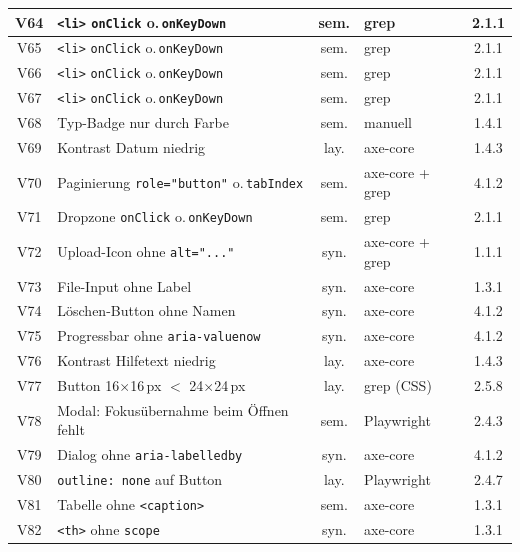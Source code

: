 \begin{longtable}{|c|p{5.8cm}|c|p{3.6cm}|c|}
V64  & \texttt{<li>} \texttt{onClick} o.\,\texttt{onKeyDown} & sem. & grep    & 2.1.1 \\ \hline
V65  & \texttt{<li>} \texttt{onClick} o.\,\texttt{onKeyDown} & sem. & grep    & 2.1.1 \\ \hline
V66  & \texttt{<li>} \texttt{onClick} o.\,\texttt{onKeyDown} & sem. & grep    & 2.1.1 \\ \hline
V67  & \texttt{<li>} \texttt{onClick} o.\,\texttt{onKeyDown} & sem. & grep    & 2.1.1 \\ \hline
V68  & Typ-Badge nur durch Farbe                 & sem. & manuell                 & 1.4.1 \\ \hline
V69  & Kontrast Datum niedrig                    & lay. & axe-core                & 1.4.3 \\ \hline
V70  & Paginierung \texttt{role="button"} o.\,\texttt{tabIndex} & sem. & axe-core + grep & 4.1.2 \\ \hline
V71  & Dropzone \texttt{onClick} o.\,\texttt{onKeyDown} & sem. & grep          & 2.1.1 \\ \hline
V72  & Upload-Icon ohne \texttt{alt="..."}             & syn. & axe-core + grep         & 1.1.1 \\ \hline
V73  & File-Input ohne Label                     & syn. & axe-core                & 1.3.1 \\ \hline
V74  & Löschen-Button ohne Namen                & syn. & axe-core                & 4.1.2 \\ \hline
V75  & Progressbar ohne \texttt{aria-valuenow}   & syn. & axe-core                & 4.1.2 \\ \hline
V76  & Kontrast Hilfetext niedrig                & lay. & axe-core                & 1.4.3 \\ \hline
V77  & Button 16$\times$16\,px $<$ 24$\times$24\,px & lay. & grep (\ac{CSS})     & 2.5.8 \\ \hline
V78  & Modal: Fokusübernahme beim Öffnen fehlt                     & sem. & Playwright              & 2.4.3 \\ \hline
V79  & Dialog ohne \texttt{aria-labelledby}      & syn. & axe-core                & 4.1.2 \\ \hline
V80  & \texttt{outline: none} auf Button         & lay. & Playwright              & 2.4.7 \\ \hline
V81  & Tabelle ohne \texttt{<caption>}           & sem. & axe-core                & 1.3.1 \\ \hline
V82  & \texttt{<th>} ohne \texttt{scope}         & syn. & axe-core                & 1.3.1 \\ \hline

\end{longtable}
